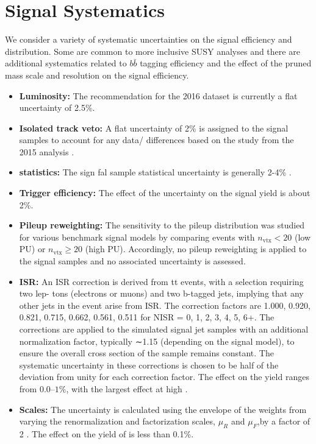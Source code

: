 \section{Signal Systematics}
\label{sec:signalsys}
We consider a variety of systematic uncertainties on the signal efficiency and distribution. Some are common to more 
inclusive SUSY analyses \cite{RA2b:Moriond} and there are additional systematics related to $b\bar{b}$ tagging efficiency and 
the effect of the pruned mass scale and resolution on the signal efficiency.  
\begin{itemize}
\item {\bf Luminosity:} The recommendation for the 2016 dataset is currently a flat uncertainty of 2.5\%.
\item {\bf Isolated track veto:} A flat uncertainty of 2\% is assigned to the signal samples to account for any data/ differences based on the study from the 2015 analysis \cite{RA2b:Moriond}.
\item {\bf  statistics:} The sign fal  sample statistical uncertainty is generally 2-4\% .
\item {\bf Trigger efficiency:} The effect of the uncertainty on the signal yield is about 2\%.
\item {\bf Pileup reweighting:} The sensitivity to the pileup distribution was studied for various benchmark signal models by comparing events with $n_{\textrm{vtx}} < 20$ (low PU) or $n_{\textrm{vtx}} \geq 20$ (high PU). Accordingly, no pileup reweighting is applied to the signal  samples and no associated uncertainty is assessed.
\item {\bf ISR:} An ISR correction is derived from tt events, with a selection requiring two lep-
tons (electrons or muons) and two b-tagged jets, implying that any other jets in the
event arise from ISR. The correction factors are 1.000, 0.920, 0.821, 0.715, 0.662, 0.561,
0.511 for NISR = 0, 1, 2, 3, 4, 5, 6+. The corrections are applied to the simulated signal jet
samples with an additional normalization factor, typically ∼1.15 (depending on the signal model), to ensure the overall cross section of the sample remains constant. The systematic uncertainty in these corrections is chosen to be half of the deviation from unity for each correction factor. The effect on the yield ranges from $0.0–1\%$, with the largest effect at high \ptmiss.
\item {\bf Scales:} The uncertainty is calculated using the envelope of the weights from varying the renormalization and factorization scales, $\mu_{R}$ and $\mu_{F}$,by a factor of 2 \cite{Cacciari:2003fi, Catani:2003zt}. The effect on the yield of is less than 0.1\%.

\end{itemize}
